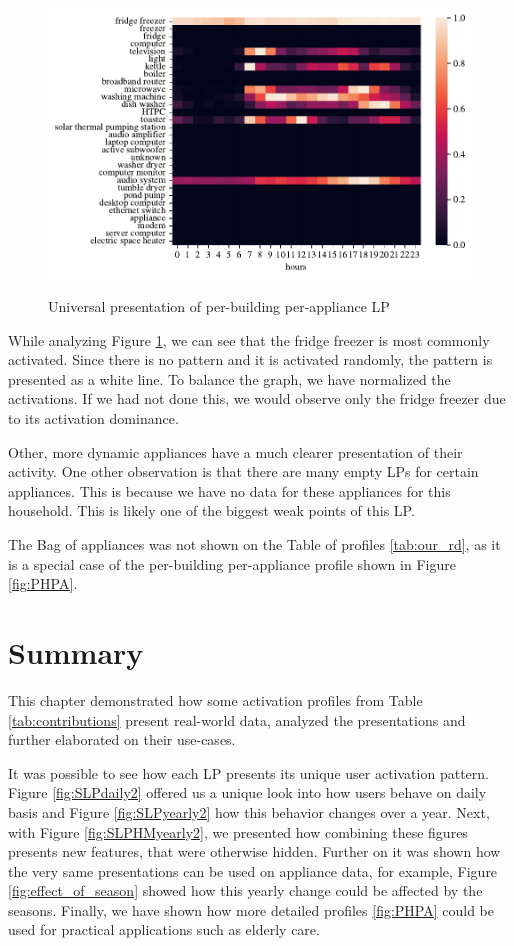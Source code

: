 \begin{figure}[H]
	\centering
	\caption{Universal presentation of per-building per-appliance LP}
	\includegraphics[width=1\textwidth]{../Figures/LPS/BOA.pdf}
	\label{fig:BOA}
\end{figure}

While analyzing Figure \ref{fig:BOA}, we can see that the fridge freezer is most commonly activated.
Since there is no pattern and it is activated randomly, the pattern is presented as a white line.
To balance the graph, we have normalized the activations.
If we had not done this, we would observe only the fridge freezer due to its activation dominance.

Other, more dynamic appliances have a much clearer presentation of their activity. 
One other observation is that there are many empty LPs for certain appliances. 
This is because we have no data for these appliances for this household. 
This is likely one of the biggest weak points of this LP.

The Bag of appliances was not shown on the Table of profiles \ref{tab:our_rd}, 
as it is a special case of the per-building per-appliance profile shown in Figure \ref{fig:PHPA}.

\section{Summary}

This chapter demonstrated how some activation profiles from Table \ref{tab:contributions} present real-world data, analyzed the presentations and further elaborated on their use-cases.

It was possible to see how each LP presents its unique user activation pattern. 
Figure \ref{fig:SLPdaily2} offered us a unique look into how users behave on daily basis and Figure \ref{fig:SLPyearly2} how this behavior changes over a year.
Next, with Figure \ref{fig:SLPHMyearly2}, we presented how combining these figures presents new features, that were otherwise hidden.
Further on it was shown how the very same presentations can be used on appliance data, for example, Figure \ref{fig:effect_of_season} showed how this yearly change could be affected by the seasons.
Finally, we have shown how more detailed profiles \ref{fig:PHPA} could be used for practical applications such as elderly care. 